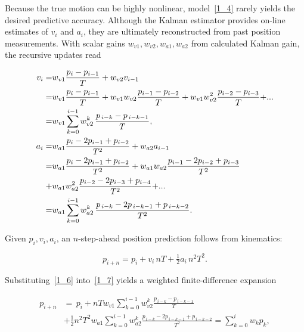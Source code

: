 \documentclass[sn-nature]{sn-jnl}%
\theoremstyle{thmstyleone}%
\theoremstyle{thmstyletwo}%
\theoremstyle{thmstylethree}%
\begin{document}
\noindent

\medskip
Because the true motion can be highly nonlinear, model~\eqref{1_4} rarely yields the desired predictive accuracy.  Although the Kalman estimator provides on-line estimates of \(v_i\) and \(a_i\), they are ultimately reconstructed from past position measurements.  With scalar gains \(w_{v1},w_{v2},w_{a1},w_{a2}\) from calculated Kalman gain, the recursive updates read

\begin{equation}
\label{1_6}
\begin{aligned}
{v_i} =& {w_{v1}}\frac{{{p_i} - {p_{i - 1}}}}{T} + {w_{v2}}{v_{i - 1}}\\
    =& {w_{v1}}\frac{{{p_i} - {p_{i - 1}}}}{T} + {w_{v1}}{w_{v2}}\frac{{{p_{i - 1}} - {p_{i - 2}}}}{T} + {w_{v1}}w_{v2}^{\rm{2}}\frac{{{p_{i - {\rm{2}}}} - {p_{i - {\rm{3}}}}}}{T}{\rm{ + }}...\\
    =& w_{v1}\sum_{k=0}^{i-1} w_{v2}^{k}\,
       \frac{p_{\,i-k}-p_{\,i-k-1}}{T},\\
{a_i} =& {w_{a1}}\frac{{{p_i} - 2{p_{i - 1}} + {p_{i - 2}}}}{{{T^2}}} + {w_{a2}}{a_{i - 1}}\\
    =& {w_{a1}}\frac{{{p_i} - 2{p_{i - 1}} + {p_{i - 2}}}}{{{T^2}}}+ {w_{a1}}{w_{a2}}\frac{{{p_{i - 1}} - 2{p_{i - 2}} + {p_{i - 3}}}}{{{T^2}}} \\
    +& {w_{a1}}w_{a2}^{\rm{2}}\frac{{{p_{i - 2}} - 2{p_{i - 3}} + {p_{i - 4}}}}{{{T^2}}}{\rm{ + }}...\\
    =& w_{a1}\sum_{k=0}^{i-1} w_{a2}^{k}\,
        \frac{p_{\,i-k}-2p_{\,i-k-1}+p_{\,i-k-2}}{T^{2}} .
\end{aligned}
\end{equation}

\noindent
Given \(p_i,v_i,a_i\), an \(n\)-step-ahead position prediction follows from kinematics:

\begin{equation}
\label{1_7}
p_{i+n}=p_i+v_i\,nT+\tfrac12 a_i\,n^{2}T^{2}.
\end{equation}

\noindent
Substituting~\eqref{1_6} into~\eqref{1_7} yields a weighted finite-difference expansion

\begin{equation}
\label{1_8}
\begin{aligned}
p_{i+n} &=\, p_i + nTw_{v1}\sum_{k=0}^{i-1} w_{v2}^{k} \frac{p_{\,i-k}-p_{\,i-k-1}}{T}\\
&+\tfrac12 n^{2}T^{2} w_{a1}\sum_{k=0}^{i-1} w_{a2}^{k}\frac{p_{\,i-k}-2p_{\,i-k-1}+p_{\,i-k-2}}{T^{2}} = \sum_{k=0}^{i} w_k p_k,
\end{aligned}
\end{equation}
\end{document}

